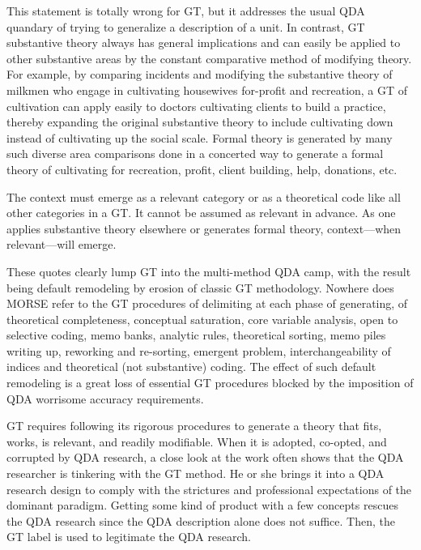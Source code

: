 This statement is totally wrong for GT, but it addresses the usual QDA quandary of trying to generalize a description of a unit. 
In contrast, GT substantive theory always has general implications and can easily be applied to other substantive areas by the constant comparative method of modifying theory. 
For example, by comparing incidents and modifying the substantive theory of milkmen who engage in cultivating housewives for-profit and recreation, a GT of cultivation can apply easily to doctors cultivating clients to build a practice, thereby expanding the original substantive theory to include cultivating down instead of cultivating up the social scale. 
Formal theory is generated by many such diverse area comparisons done in a concerted way to generate a formal theory of cultivating for recreation, profit, client building, help, donations, etc.

The context must emerge as a relevant category or as a theoretical code like all other categories in a GT. 
It cannot be assumed as relevant in advance. 
As one applies substantive theory elsewhere or generates formal theory, context—when relevant—will emerge.

These quotes clearly lump GT into the multi-method QDA camp, with the result being default remodeling by erosion of classic GT methodology. 
Nowhere does MORSE refer to the GT procedures of delimiting at each phase of generating, of theoretical completeness, conceptual saturation, core variable analysis, open to selective coding, memo banks, analytic rules, theoretical sorting, memo piles writing up, reworking and re-sorting, emergent problem, interchangeability of
indices and theoretical (not substantive) coding. 
The effect of such default remodeling is a great loss of essential GT procedures blocked by the imposition of QDA worrisome accuracy requirements.

GT requires following its rigorous procedures to generate a theory that fits, works, is relevant, and readily modifiable. 
When it is adopted, co-opted, and corrupted by QDA research, a close look at the work often shows that the QDA researcher is tinkering with the GT method. 
He or she brings it into a QDA research design to comply with the strictures and professional expectations of the dominant paradigm. 
Getting some kind of product with a few concepts rescues the QDA research since the QDA description alone does not suffice.
Then, the GT label is used to legitimate the QDA research.

